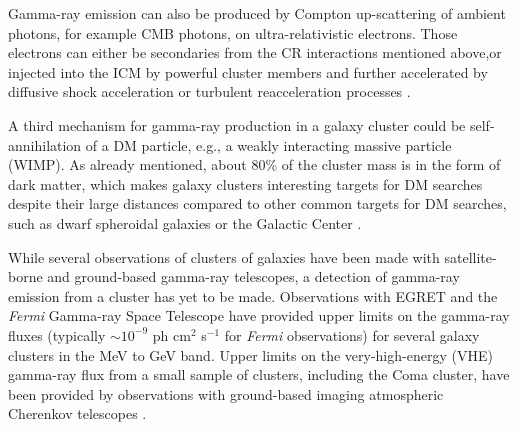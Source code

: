 \documentclass[12pt,manuscript]{aastex}
\def\Fermi{{\em Fermi}\xspace}
\begin{document}
Gamma-ray emission can also be produced by Compton up-scattering of ambient photons, for example
CMB photons, on ultra-relativistic electrons. Those electrons can either be secondaries from the
CR interactions mentioned above,or injected into the ICM by powerful cluster members and
further accelerated by diffusive shock acceleration or turbulent reacceleration processes
\citep[][and references therein]{article:SchlickeiserSieversThiemann:1987}.

A third mechanism for gamma-ray production in a galaxy cluster could be self-annihilation of a DM
particle, e.g., a weakly interacting massive particle (WIMP). As already mentioned, about 80\% of
the cluster mass is in the form of dark matter, which makes galaxy clusters interesting targets for
DM searches \citep{article:EvansFerrerSarkar:2004, article:BergstromHooper:2006,
article:PinzkePfrommerBergstrom2009, article:Cuesta_etal:2011} despite their large distances
compared to other common targets for DM searches, such as dwarf spheroidal galaxies
\citep{article:Strigari_etal:2007, article:Acciari_etal:2010, article:Aliu_etal:2009} or the
Galactic Center \citep{article:Kosack_etal:2004, article:Aharonian_etal:2006,
article:Aharonian_etal:2009b, article:Abramowski_etal:2011}. 

While several observations of clusters of galaxies have been made with satellite-borne and
ground-based gamma-ray telescopes, a detection of gamma-ray emission from a cluster has yet to be
made. Observations with EGRET \citep{article:Sreekumar_etal:1996, article:Reimer_etal:2003} and the
\Fermi Gamma-ray Space Telescope \citep{article:Ackermann_etal:2010} have provided upper limits on
the gamma-ray fluxes (typically $\sim10^{-9}$ ph cm$^{2}$ s$^{-1}$ for \Fermi observations) for
several galaxy clusters in the MeV to GeV band. Upper limits on the very-high-energy (VHE)
gamma-ray flux from a small sample of clusters, including the Coma cluster, have been provided by
observations with ground-based imaging atmospheric Cherenkov telescopes
\citep[IACTs;][]{article:Perkins_etal:2006, inproc:Perkins_etal:2008, article:Aharonian_etal:2009a,
article:Aleksic_etal:2010}.
\end{document}
